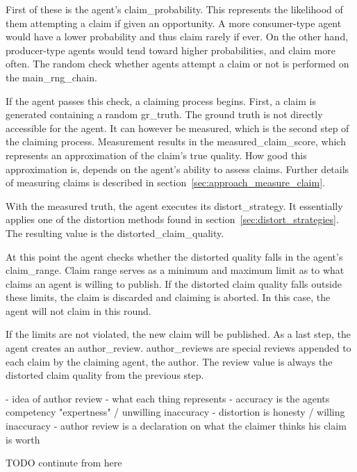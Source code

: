 \documentclass[%
    ]{\PathToTumTemplate/thesis/tum_thesis}
\begin{document}
First of these is the agent's \gls{claim_probability}.
This represents the likelihood of them attempting a claim if given an opportunity.
A more consumer-type agent would have a lower probability and thus claim rarely if ever.
On the other hand, producer-type agents would tend toward higher probabilities, and claim more often.
The random check whether agents attempt a claim or not is performed on the \gls{main_rng_chain}.

If the agent passes this check, a claiming process begins.
First, a claim is generated containing a random \gls{gr_truth}. 
The ground truth is not directly accessible for the agent.
It can however be measured, which is the second step of the claiming process.
Measurement results in the \gls{measured_claim_score}, which represents an approximation of the claim's true quality.
How good this approximation is, depends on the agent's ability to assess claims.
Further details of measuring claims is described in section~\ref{sec:approach_measure_claim}.

With the measured truth, the agent executes its \gls{distort_strategy}.
It essentially applies one of the distortion methods found in section~\ref{sec:distort_strategies}.
The resulting value is the \gls{distorted_claim_quality}.

At this point the agent checks whether the distorted quality falls in the agent's \gls{claim_range}.
Claim range serves as a minimum and maximum limit as to what claims an agent is willing to publish.
If the distorted claim quality falls outside these limits, the claim is discarded and claiming is aborted.
In this case, the agent will not claim in this round.

If the limits are not violated, the new claim will be published.
As a last step, the agent creates an \gls{author_review}.
\Glspl{author_review} are special \glspl{review} appended to each claim by the claiming agent, the author.
The review value is always the distorted claim quality from the previous step.

- idea of author review
- what each thing represents
  - accuracy is the agents competency "expertness" / unwilling inaccuracy
  - distortion is honesty / willing inaccuracy
  - author review is a declaration on what the claimer thinks his claim is worth

TODO continute from here
\end{document}
